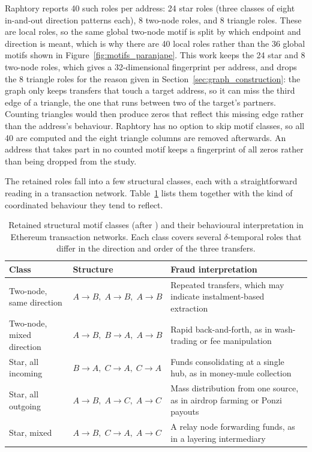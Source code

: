 \documentclass{thesisclass}
\begin{document}
Raphtory reports 40 such roles per address: 24 star roles (three classes of
eight in-and-out direction patterns each), 8 two-node roles, and 8 triangle
roles. These are local roles, so the same global two-node motif is split by which
endpoint and direction is meant, which is why there are 40 local roles rather
than the 36 global motifs shown in Figure~\ref{fig:motifs_paranjape}. This work
keeps the 24 star and 8 two-node roles, which gives a 32-dimensional fingerprint
per address, and drops the 8 triangle roles for the reason given in
Section~\ref{sec:graph_construction}: the graph only keeps transfers that touch a
target address, so it can miss the third edge of a triangle, the one that runs
between two of the target's partners. Counting triangles would then produce zeros
that reflect this missing edge rather than the address's behaviour. Raphtory has no
option to skip motif classes, so all 40 are computed and the eight triangle
columns are removed afterwards. An address that takes part in no counted motif
keeps a fingerprint of all zeros rather than being dropped from the study.

The retained roles fall into a few structural classes, each with a
straightforward reading in a transaction network.
Table~\ref{tab:motif_classes} lists them together with the kind of coordinated
behaviour they tend to reflect.

\begin{table}[h]
\centering
\caption{Retained structural motif classes (after \cite{paranjape2017motifs})
and their behavioural interpretation in Ethereum transaction networks. Each
class covers several $\delta$-temporal roles that differ in the direction and
order of the three transfers.}
\label{tab:motif_classes}
\begin{tabular}{p{3.5cm} p{4.5cm} p{5cm}}
\toprule
\textbf{Class} & \textbf{Structure} & \textbf{Fraud interpretation} \\
\midrule
Two-node, same direction &
    $A \to B,\; A \to B,\; A \to B$ &
    Repeated transfers, which may indicate instalment-based extraction \\[4pt]
Two-node, mixed direction &
    $A \to B,\; B \to A,\; A \to B$ &
    Rapid back-and-forth, as in wash-trading or fee manipulation \\[4pt]
Star, all incoming &
    $B \to A,\; C \to A,\; C \to A$ &
    Funds consolidating at a single hub, as in money-mule collection \\[4pt]
Star, all outgoing &
    $A \to B,\; A \to C,\; A \to C$ &
    Mass distribution from one source, as in airdrop farming or Ponzi payouts \\[4pt]
Star, mixed &
    $A \to B,\; C \to A,\; A \to C$ &
    A relay node forwarding funds, as in a layering intermediary \\
\bottomrule
\end{tabular}
\end{table}
\end{document}
